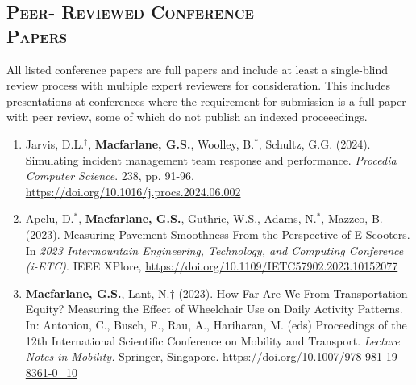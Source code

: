 \documentclass[margin,line]{res}
\newif\ifdetail
\newcounter{enuminitialize}
\newenvironment{myenum}[1][]
{%
 \setcounter{enuminitialize}{#1}
 \addtocounter{enuminitialize}{2}
 \begin{enumerate}[left= 4pt, itemsep=8pt, start=\value{enuminitialize}, label=\arabic*\addtocounter{enumi}{-2}]
}
{%
 \end{enumerate}
}
\newcommand{\secfont}{\scshape }
\begin{document}
\begin{resume}
\section{\secfont Peer- Reviewed Conference \\ Papers}
All listed conference papers are full papers and include at least a
single-blind review process with multiple expert reviewers for consideration.
This includes presentations at conferences where the requirement for submission is a full paper
with peer review, some of which do not publish an indexed proceeedings.
\ifdetail Papers 1 and 2 resulted from my undergraduate honors thesis, papers 3 through 5 work completed in graduate school, and since represent work completed since joining the faculty at BYU.\fi
\vspace{.3cm}
\begin{myenum}[11]
  \ifdetail {\color{NavyBlue} \fi
\item Jarvis, D.L.$^\dagger$, \textbf{Macfarlane, G.S.}, Woolley, B.$^*$, Schultz, G.G. (2024). Simulating incident management team response and performance. \textit{Procedia Computer Science}. 238,
pp. 91-96.  \url{https://doi.org/10.1016/j.procs.2024.06.002}

\item Apelu, D.$^*$, \textbf{Macfarlane, G.S.}, Guthrie, W.S., Adams, N.$^*$, Mazzeo, B. (2023). Measuring Pavement Smoothness From the Perspective of E-Scooters. In \textit{2023 Intermountain Engineering, Technology, and Computing Conference (i-ETC)}. IEEE XPlore, \url{https://doi.org/10.1109/IETC57902.2023.10152077}

\item \textbf{Macfarlane, G.S.}, Lant, N.$\dagger$ (2023). How Far Are We From Transportation Equity? Measuring the Effect of Wheelchair Use on Daily Activity Patterns. In: Antoniou, C., Busch, F., Rau, A., Hariharan, M. (eds) Proceedings of the 12th International Scientific Conference on Mobility and Transport. \textit{Lecture Notes in Mobility.} Springer, Singapore. \url{https://doi.org/10.1007/978-981-19-8361-0_10}
\ifdetail } \fi


\end{myenum}
\end{resume}
\end{document}
